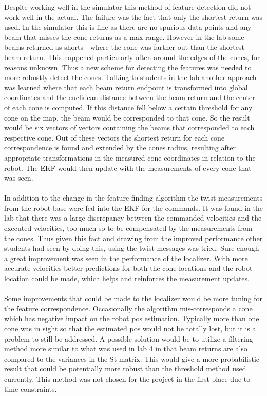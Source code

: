\documentclass[letterpaper,12pt]{article}
\begin{document}
Despite working well in the simulator this method of feature detection did not work well in the actual. The failure was the fact that only the shortest return was used. In the simulator this is fine as there are no spurious data points and any beam that misses the cone returns as a max range. However in the lab some beams returned as shorts - where the cone was farther out than the shortest beam return. This happened particularly often around the edges of the cones, for reasons unknown. Thus a new scheme for detecting the features was needed to more robustly detect the cones. Talking to students in the lab another approach was learned where that each beam return endpoint is transformed into global coordinates and the euclidean distance between the beam return and the center of each cone is computed. If this distance fell below a certain threshold for any cone on the map, the beam would be corresponded to that cone. So the result would be six vectors of vectors containing the beams that corresponded to each respective cone. Out of these vectors the shortest return for each cone correspondence is found and extended by the cones radius, resulting after appropriate transformations in the measured cone coordinates in relation to the robot. The EKF would then update with the measurements of every cone that was seen.
\\\\
In addition to the change in the feature finding algorithm the twist measurements from the robot base were fed into the EKF for the commands. It was found in the lab that there was a large discrepancy between the commanded velocities and the executed velocities, too much so to be compensated by the measurements from the cones. Thus given this fact and drawing from the improved performance other students had seen by doing this, using the twist messages was tried. Sure enough a great improvement was seen in the performance of the localizer. With more accurate velocities better predictions for both the cone locations and the robot location could be made, which helps and reinforces the measurement updates.  
\\\\
Some improvements that could be made to the localizer would be more tuning for the feature correspondence. Occasionally the algorithm mis-corresponds a cone which has negative impact on the robot pos estimation. Typically more than one cone was in sight so that the estimated pos would not be totally lost, but it is a problem to still be addressed. A possible solution would be to utilize a filtering method more similar to what was used in lab 4 in that beam returns are also compared to the variances in the St matrix. This would give a more probabilistic result that could be potentially more robust than the threshold method used currently. This method was not chosen for the project in the first place due to time constraints.
\end{document}
